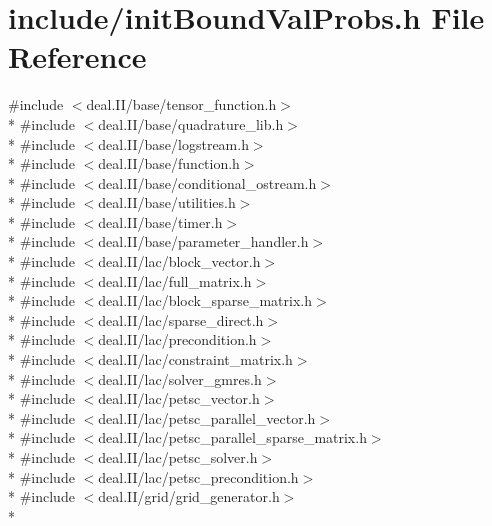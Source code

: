 \section{include/init\-Bound\-Val\-Probs.h File Reference}
\label{init_bound_val_probs_8h}
{\ttfamily \#include $<$deal.\-I\-I/base/tensor\-\_\-function.\-h$>$}\\*
{\ttfamily \#include $<$deal.\-I\-I/base/quadrature\-\_\-lib.\-h$>$}\\*
{\ttfamily \#include $<$deal.\-I\-I/base/logstream.\-h$>$}\\*
{\ttfamily \#include $<$deal.\-I\-I/base/function.\-h$>$}\\*
{\ttfamily \#include $<$deal.\-I\-I/base/conditional\-\_\-ostream.\-h$>$}\\*
{\ttfamily \#include $<$deal.\-I\-I/base/utilities.\-h$>$}\\*
{\ttfamily \#include $<$deal.\-I\-I/base/timer.\-h$>$}\\*
{\ttfamily \#include $<$deal.\-I\-I/base/parameter\-\_\-handler.\-h$>$}\\*
{\ttfamily \#include $<$deal.\-I\-I/lac/block\-\_\-vector.\-h$>$}\\*
{\ttfamily \#include $<$deal.\-I\-I/lac/full\-\_\-matrix.\-h$>$}\\*
{\ttfamily \#include $<$deal.\-I\-I/lac/block\-\_\-sparse\-\_\-matrix.\-h$>$}\\*
{\ttfamily \#include $<$deal.\-I\-I/lac/sparse\-\_\-direct.\-h$>$}\\*
{\ttfamily \#include $<$deal.\-I\-I/lac/precondition.\-h$>$}\\*
{\ttfamily \#include $<$deal.\-I\-I/lac/constraint\-\_\-matrix.\-h$>$}\\*
{\ttfamily \#include $<$deal.\-I\-I/lac/solver\-\_\-gmres.\-h$>$}\\*
{\ttfamily \#include $<$deal.\-I\-I/lac/petsc\-\_\-vector.\-h$>$}\\*
{\ttfamily \#include $<$deal.\-I\-I/lac/petsc\-\_\-parallel\-\_\-vector.\-h$>$}\\*
{\ttfamily \#include $<$deal.\-I\-I/lac/petsc\-\_\-parallel\-\_\-sparse\-\_\-matrix.\-h$>$}\\*
{\ttfamily \#include $<$deal.\-I\-I/lac/petsc\-\_\-solver.\-h$>$}\\*
{\ttfamily \#include $<$deal.\-I\-I/lac/petsc\-\_\-precondition.\-h$>$}\\*
{\ttfamily \#include $<$deal.\-I\-I/grid/grid\-\_\-generator.\-h$>$}\\*
